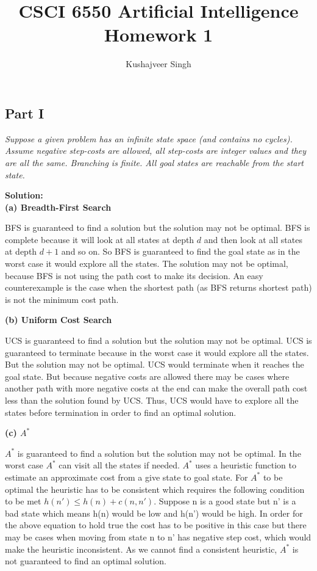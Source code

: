 \documentclass[12pt,a4paper]{article}
\title{CSCI 6550 Artificial Intelligence Homework 1}
\author{Kushajveer Singh}
\date{}
\newcommand{\solution}{\noindent\textbf{Solution:}\\}
\begin{document}
\maketitle

\subsection*{Part I}
\textit{
    Suppose a given problem has an infinite state space (and contains no cycles). Assume negative step-costs are allowed, all step-costs are integer values and they are all the same. Branching is finite. All goal states are reachable from the start state.
}

\solution
\textbf{(a) Breadth-First Search}

BFS is guaranteed to find a solution but the solution may not be optimal. BFS is complete because it will look at all states at depth $d$ and then look at all states at depth $d+1$ and so on. So BFS is guaranteed to find the goal state as in the worst case it would explore all the states. The solution may not be optimal, because BFS is not using the path cost to make its decision. An easy counterexample is the case when the shortest path (as BFS returns shortest path) is not the minimum cost path.

\noindent\textbf{(b) Uniform Cost Search}

UCS is guaranteed to find a solution but the solution may not be optimal. UCS is guaranteed to terminate because in the worst case it would explore all the states. But the solution may not be optimal. UCS would terminate when it reaches the goal state. But because negative costs are allowed there may be cases where another path with more negative costs at the end can make the overall path cost less than the solution found by UCS. Thus, UCS would have to explore all the states before termination in order to find an optimal solution.

\noindent\textbf{(c) $A^*$}

$A^*$ is guaranteed to find a solution but the solution may not be optimal. In the worst case $A^*$ can visit all the states if needed. $A^*$ uses a heuristic function to estimate an approximate cost from a give state to goal state. For $A^*$ to be optimal the heuristic has to be consistent which requires the following condition to be met $h(n') \leq h(n) + c(n,n')$. Suppose n is a good state but n' is a bad state which means h(n) would be low and h(n') would be high. In order for the above equation to hold true the cost has to be positive in this case but there may be cases when moving from state n to n' has negative step cost, which would make the heuristic inconsistent. As we cannot find a consistent heuristic, $A^*$ is not guaranteed to find an optimal solution.
\end{document}
